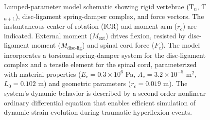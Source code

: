 \documentclass{article}
\begin{document}
\begin{figure}[H]
    \caption{Lumped-parameter model schematic showing rigid vertebrae (T$_n$, T$_{n+1}$), disc-ligament spring-damper complex, and force vectors. The instantaneous center of rotation (ICR) and moment arm ($r_c$) are indicated. External moment ($M_{\text{ext}}$) drives flexion, resisted by disc-ligament moment ($M_{\text{disc-lig}}$) and spinal cord force ($F_c$). The model incorporates a torsional spring-damper system for the disc-ligament complex and a tensile element for the spinal cord, parameterized with material properties ($E_c = 0.3 \times 10^6$ Pa, $A_c = 3.2 \times 10^{-5}$ m$^2$, $L_0 = 0.102$ m) and geometric parameters ($r_c = 0.019$ m). The system's dynamic behavior is described by a second-order nonlinear ordinary differential equation that enables efficient simulation of dynamic strain evolution during traumatic hyperflexion events.}
    \label{fig:model_schematic}
\end{figure}
\end{document}
